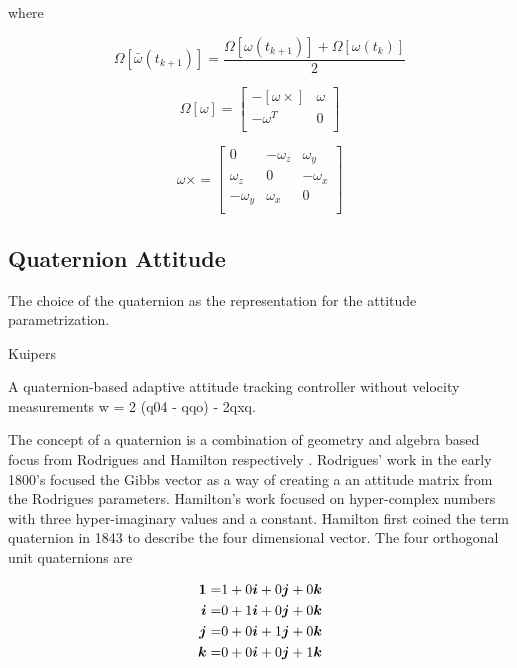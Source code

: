 where

\begin{equation}
    \Omega \left[ \bar{\omega}(t_{k+1}) \right] = \frac{\Omega \left[\omega(t_{k+1}) \right] + \Omega \left[\omega(t_{k}) \right]}{2}
    \label{eqn:DiscreteQuaternionToBodyRate}
\end{equation}

\begin{equation}
  \Omega \left[ \omega \right] =
  \begin{bmatrix}
    - [ \omega \times ] & \omega \\
    - \omega^T & 0 \\
  \end{bmatrix}
  \label{eqn:OmegaMatrix}
\end{equation}

\begin{equation}
  \omega \times =
  \begin{bmatrix}
    0 & -\omega_z & \omega_y \\
    \omega_z & 0 & -\omega_x \\
    -\omega_y & \omega_x & 0 \\
  \end{bmatrix}
\end{equation}


\subsection{Quaternion Attitude}
\label{subsec:QuaternionAttitude}

The choice of the quaternion as the representation for the attitude parametrization.

Kuipers \cite{kuipers}

A quaternion-based adaptive attitude tracking controller without velocity measurements
w = 2 (q04 - qqo) - 2qxq.




The concept of a quaternion is a combination of geometry and algebra based focus from Rodrigues and Hamilton respectively \cite{shuster}.  Rodrigues' work in the early 1800's focused the Gibbs vector as a way of creating a an attitude matrix from the Rodrigues parameters.  Hamilton's work focused on hyper-complex numbers with three hyper-imaginary values and a constant.  Hamilton first coined the term quaternion in 1843 to describe the four dimensional vector.  The four orthogonal unit quaternions are

\begin{subequations}
  \begin{align}
    \boldsymbol{1} = & 1 + 0\boldsymbol{i} + 0\boldsymbol{j} + 0\boldsymbol{k} \\
    \boldsymbol{i} = & 0 + 1\boldsymbol{i} + 0\boldsymbol{j} + 0\boldsymbol{k} \\
    \boldsymbol{j} = & 0 + 0\boldsymbol{i} + 1\boldsymbol{j} + 0\boldsymbol{k} \\
    \boldsymbol{k} = & 0 + 0\boldsymbol{i} + 0\boldsymbol{j} + 1\boldsymbol{k}
  \end{align}
  \label{eqn:UnitQuaternions}
\end{subequations}

